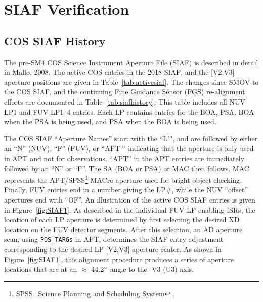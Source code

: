 \section{SIAF Verification} \label{sec:siaf}

\subsection{COS SIAF History}\label{subsec:siafhistory}
The pre-SM4 COS Science Instrument Aperture File (SIAF) is described in detail in Mallo, 2008.
The active COS entries in the 2018 SIAF, and the [V2,V3] aperture positions are given in Table~\ref{tab:activesiaf}.
The changes since SMOV to the COS SIAF, and the continuing Fine Guidance Sensor (FGS) re-alignment efforts are
documented in Table~\ref{tab:siafhistory}.
This table includes all NUV LP1 and FUV LP1--4 entries. Each LP contains entries for the BOA, PSA, BOA when the PSA is being used, and PSA when the BOA is being used.



The COS SIAF ``Aperture Names''  start with the ``L"", and are followed by either an ``N'' (NUV), ``F'' (FUV), or
``APT''' indicating that the aperture is only used in APT and not for observations.
``APT'' in the APT entries are immediately followed by an ``N'' or ``F''.
The SA (BOA or PSA) or MAC then follows. MAC represents the APT/SPSS\footnote{SPSS=Science Planning and Scheduling System} MACro aperture used for bright object checking.
Finally, FUV entries end in a number giving the LP\#, while the NUV ``offset'' apertures end with ``OF''.
An illustration of the active COS SIAF entries is given in Figure~\ref{fig:SIAF1}. As described in the individual
FUV LP enabling ISRs, the location of each LP aperture is determined by first selecting the desired XD location on the FUV detector segments. After this selection,
an AD aperture scan, using \texttt{POS\_TARGs} in APT, determines the SIAF entry adjustment corresponding to
the desired LP [V2,V3] aperture center. As shown in Figure~\ref{fig:SIAF1}, this alignment procedure produces
a series of aperture locations that are at an $\approx$ 44.2$\hbox{$^{\circ}$}$ angle to the -V3 (U3) axis.



